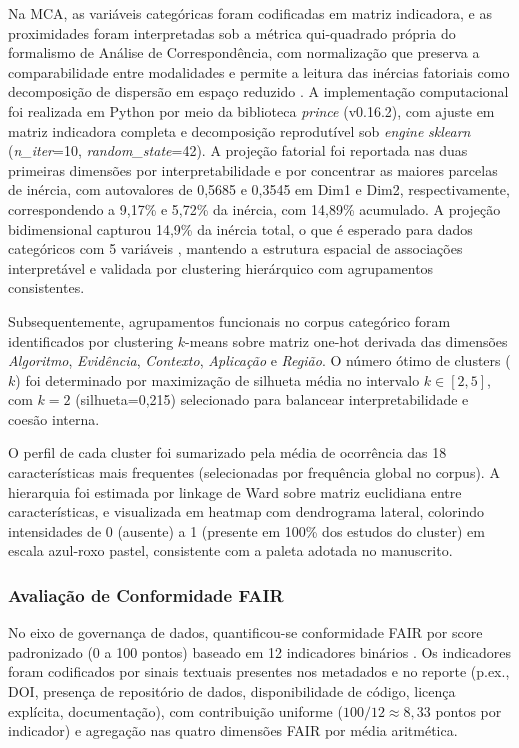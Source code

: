 \documentclass[lineno,pdflatex,sn-apa]{sn-jnl}%
\begin{document}
Na MCA, as variáveis categóricas foram codificadas em matriz indicadora, e as proximidades foram interpretadas sob a métrica qui-quadrado própria do formalismo de Análise de Correspondência, com normalização que preserva a comparabilidade entre modalidades e permite a leitura das inércias fatoriais como decomposição de dispersão em espaço reduzido \citep{Greenacre2017,Abdi2014}. A implementação computacional foi realizada em Python por meio da biblioteca \textit{prince} (v0.16.2), com ajuste em matriz indicadora completa e decomposição reprodutível sob \textit{engine} \textit{sklearn} (\textit{n\_iter}=10, \textit{random\_state}=42). A projeção fatorial foi reportada nas duas primeiras dimensões por interpretabilidade e por concentrar as maiores parcelas de inércia, com autovalores de 0,5685 e 0,3545 em Dim1 e Dim2, respectivamente, correspondendo a 9,17\% e 5,72\% da inércia, com 14,89\% acumulado. A projeção bidimensional capturou 14,9\% da inércia total, o que é esperado para dados categóricos com 5 variáveis \citep{Greenacre2017}, mantendo a estrutura espacial de associações interpretável e validada por clustering hierárquico com agrupamentos consistentes.

Subsequentemente, agrupamentos funcionais no corpus categórico foram identificados por clustering $k$-means sobre matriz one-hot derivada das dimensões \textit{Algoritmo}, \textit{Evidência}, \textit{Contexto}, \textit{Aplicação} e \textit{Região}. O número ótimo de clusters ($k$) foi determinado por maximização de silhueta média no intervalo $k \in [2, 5]$, com $k=2$ (silhueta=0,215) selecionado para balancear interpretabilidade e coesão interna.

O perfil de cada cluster foi sumarizado pela média de ocorrência das 18 características mais frequentes (selecionadas por frequência global no corpus). A hierarquia foi estimada por linkage de Ward sobre matriz euclidiana entre características, e visualizada em heatmap com dendrograma lateral, colorindo intensidades de 0 (ausente) a 1 (presente em 100\% dos estudos do cluster) em escala azul-roxo pastel, consistente com a paleta adotada no manuscrito.

\subsubsection[Avaliação de Conformidade FAIR]{Avaliação de Conformidade FAIR}

No eixo de governança de dados, quantificou-se conformidade FAIR por score padronizado (0 a 100 pontos) baseado em 12 indicadores binários \citep{Wilkinson2016}. Os indicadores foram codificados por sinais textuais presentes nos metadados e no reporte (p.ex., DOI, presença de repositório de dados, disponibilidade de código, licença explícita, documentação), com contribuição uniforme ($100/12 \approx 8{,}33$ pontos por indicador) e agregação nas quatro dimensões FAIR por média aritmética.
\end{document}

